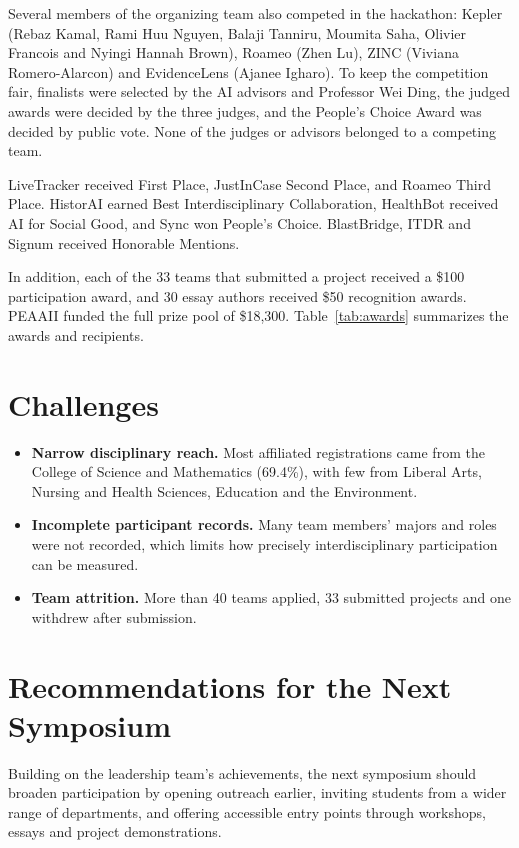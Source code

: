 \documentclass[sigconf,nonacm]{acmart}
\begin{document}
Several members of the organizing team also competed in the hackathon: Kepler (Rebaz Kamal, Rami Huu Nguyen, Balaji Tanniru, Moumita Saha, Olivier Francois and Nyingi Hannah Brown), Roameo (Zhen Lu), ZINC (Viviana Romero-Alarcon) and EvidenceLens (Ajanee Igharo). To keep the competition fair, finalists were selected by the AI advisors and Professor Wei Ding, the judged awards were decided by the three judges, and the People's Choice Award was decided by public vote. None of the judges or advisors belonged to a competing team.

LiveTracker received First Place, JustInCase Second Place, and Roameo Third Place. HistorAI earned Best Interdisciplinary Collaboration, HealthBot received AI for Social Good, and Sync won People's Choice. BlastBridge, ITDR and Signum received Honorable Mentions.

In addition, each of the 33 teams that submitted a project received a \$100 participation award, and 30 essay authors received \$50 recognition awards. PEAAII funded the full prize pool of \$18,300. Table~\ref{tab:awards} summarizes the awards and recipients.


\section{Challenges}
\begin{itemize}
  \item \textbf{Narrow disciplinary reach.} Most affiliated registrations came from the College of Science and Mathematics (69.4\%), with few from Liberal Arts, Nursing and Health Sciences, Education and the Environment.
  \item \textbf{Incomplete participant records.} Many team members' majors and roles were not recorded, which limits how precisely interdisciplinary participation can be measured.
  \item \textbf{Team attrition.} More than 40 teams applied, 33 submitted projects and one withdrew after submission.
\end{itemize}

\section{Recommendations for the Next Symposium}
Building on the leadership team's achievements, the next symposium should broaden participation by opening outreach earlier, inviting students from a wider range of departments, and offering accessible entry points through workshops, essays and project demonstrations.
\end{document}
